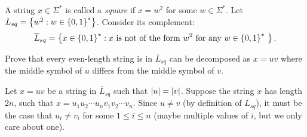 \begin{problem}
  A string $x \in \Sigma^*$ is called a \emph{square}
  if $x = w^2$ for some $w \in \Sigma^*$.
  Let $L_{sq} = \left\{w^2 : w \in \left\{0, 1\right\}^*\right\}$.
  Consider its complement:
  \[ \overline{L}_{sq} =
    \left\{x \in \left\{0, 1\right\}^* : x
      \text{
        is not of the form $w^2$ for any $w \in \left\{0, 1\right\}^*$
      }
    \right\}.
  \]

  \step
  \begin{enumalph}
    \item Prove that every even-length string is in $\overline{L}_{sq}$
      can be decomposed as $x = uv$ where the middle symbol of $u$
      differs from the middle symbol of $v$.
      \begin{Answer}
        Let $x = uv$ be a string in $\overline{L}_{sq}$
        such that $\lvert u\rvert = \lvert v\rvert$.
        Suppose the string $x$ has length $2n$, such that
        $x = u_1u_2 \cdots u_n v_1v_2 \cdots v_n$.
        Since $u \ne v$ (by definition of $\overline{L}_{sq}$),
        it must be the case that $u_i \ne v_i$ for some $1 \le i \le n$
        (maybe multiple values of $i$, but we only care about one).
        

\end{Answer}
\end{enumalph}
\end{problem}
